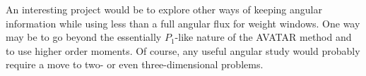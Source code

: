 An interesting project would be to explore other ways of keeping angular
information while using less than a full angular flux for weight windows.  One
way may be to go beyond the essentially $P_1$-like nature of the AVATAR method
and to use higher order moments.  Of course, any useful angular study would
probably require a move to two- or even three-dimensional problems.  

% 
% 
% 
% 
% 
